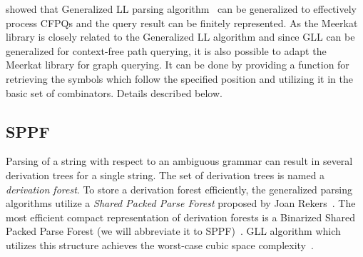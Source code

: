 \cite{GrigorevR16} showed that Generalized LL parsing algorithm~\cite{scott2010gll} can be generalized to effectively process CFPQs and the query result can be finitely represented.
As the Meerkat library is closely related to the Generalized LL algorithm and since GLL can be generalized for context-free path querying, it is also possible to adapt the Meerkat library for graph querying.
It can be done by providing a function for retrieving the symbols which follow the specified position and utilizing it in the basic set of combinators.
Details described below.





\subsection{SPPF}

Parsing of a string with respect to an ambiguous grammar can result in several derivation trees for a single string.
The set of derivation trees is named a \emph{derivation forest}.
To store a derivation forest efficiently, the generalized parsing algorithms utilize a \emph{Shared Packed Parse Forest} proposed by Joan Rekers~\cite{SPPF}.
The most efficient compact representation of derivation forests is a Binarized Shared Packed Parse Forest (we will abbreviate it to SPPF)~\cite{brnglr}.
GLL algorithm which utilizes this structure achieves the worst-case cubic space complexity~\cite{gllParsingTree}.


